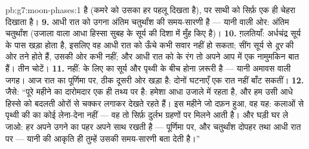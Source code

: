 \begin{solution}{pb:g7:moon-phases:1}
है (कमरे को उसका हर पहलू दिखता है), पर साथी को सिर्फ़ एक ही चेहरा
दिखाता है।
\textbf{9.} आधी रात को उगना अंतिम चतुर्थांश की समय-सारणी है ---
यानी  वाली ओर: अंतिम चतुर्थांश (उजाला वाला आधा हिस्सा सुबह
के सूर्य की दिशा में मुँह किए है)।
\textbf{10.} ग़लतियाँ: अर्धचंद्र सूर्य के पास खड़ा होता है, इसलिए वह
आधी रात को ऊँचे कभी सवार नहीं हो सकता; सींग सूर्य से \emph{दूर} की ओर
तने होते हैं, उसकी ओर कभी नहीं; और आधी रात को  के रंग तो
अपने आप में एक नामुमकिन बात हैं। तीन चोटें।
\textbf{11.} नहीं:  के लिए  का सूर्य और पृथ्वी के
बीच होना ज़रूरी है --- यानी अमावस वाली जगह। आज रात का  पूर्णिमा
पर, ठीक दूसरी ओर खड़ा है: दोनों घटनाएँ एक रात नहीं बाँट सकतीं।
\textbf{12.} जैसे: ``पूरे महीने का दारोमदार एक ही तथ्य पर है: 
हमेशा आधा उजाले में रहता है, और हम उसी आधे हिस्से को बदलती ओरों से
चक्कर लगाकर देखते रहते हैं। इस महीने जो दफ़न हुआ, वह यह: कलाओं से
पृथ्वी की  का कोई लेना-देना नहीं --- वह तो सिर्फ़ दुर्लभ ग्रहणों
पर मिलने आती है। और घड़ी घर ले जाओ: हर  अपने उगने का पहर अपने साथ
रखती है --- पूर्णिमा  पर, और चतुर्थांश दोपहर तथा आधी रात पर
--- यानी  की आकृति ही तुम्हें उसकी समय-सारणी बता देती है।''
\end{solution}

